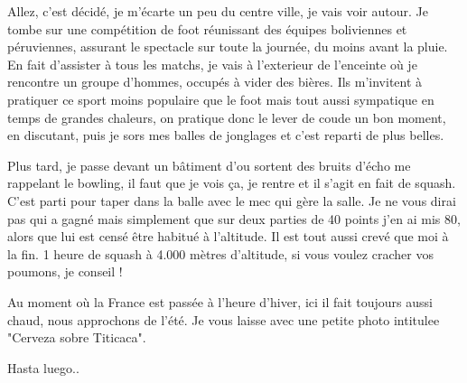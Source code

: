 \begin{multicols}{2}

Allez, c'est décidé, je m'écarte un peu du centre ville, je vais voir autour. Je tombe sur une compétition de foot réunissant des équipes boliviennes et péruviennes, assurant le spectacle sur toute la journée, du moins avant la pluie. En fait d'assister à tous les matchs, je vais à l'exterieur de l'enceinte où je rencontre un groupe d'hommes, occupés à vider des bières. Ils m'invitent à pratiquer ce sport moins populaire que le foot mais tout aussi sympatique en temps de grandes chaleurs, on pratique donc le lever de coude un bon moment, en discutant, puis je sors mes balles de jonglages et c'est reparti de plus belles.


Plus tard, je passe devant un bâtiment d'ou sortent des bruits d'écho me rappelant le bowling, il faut que je vois ça, je rentre et il s'agit en fait de squash. C'est parti pour taper dans la balle avec le mec qui gère la salle. Je ne vous dirai pas qui a gagné mais simplement que sur deux parties de 40 points j'en ai mis 80, alors que lui est censé être habitué à l'altitude. Il est tout aussi crevé que moi à la fin. 1 heure de squash à 4.000 mètres d'altitude, si vous voulez cracher vos poumons, je conseil !

Au moment où la France est passée à l'heure d'hiver, ici il fait toujours aussi chaud, nous approchons de l'été. Je vous laisse avec une petite photo intitulee "Cerveza sobre Titicaca".


Hasta luego..

\end{multicols}


